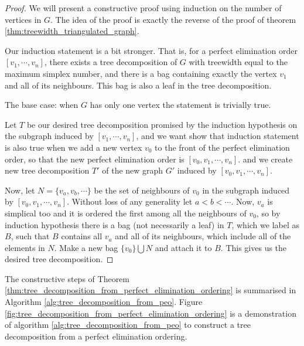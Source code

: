 \begin{proof}
	We will present a constructive proof using induction on the number of vertices in $G$.
	The idea of the proof is exactly the reverse of the proof of theorem \ref{thm:treewidth_triangulated_graph}.

	Our induction statement is a bit stronger. That is, for a perfect elimination order $[v_1, \cdots, v_n]$, there exists a tree decomposition of $G$ with treewidth equal to the maximum simplex number, and there is a bag containing exactly the vertex $v_1$ and all of its neighbours. This bag is also a leaf in the tree decomposition.

	The base case: when $G$ has only one vertex the statement is trivially true.

	Let $T$ be our desired tree decomposition promised by the induction hypothesis on the subgraph induced by $[v_1, \cdots, v_n]$, and we want show that induction statement is also true when we add a new vertex $v_0$ to the front of the perfect elimination order, so that the new perfect elimination order is $[v_0, v_1, \cdots, v_n]$. and we create new tree decomposition $T'$ of the new graph $G'$ induced by $[v_0, v_1, \cdots, v_n]$.

	Now, let $N = \{v_a, v_b, \cdots\}$ be the set of neighbours of $v_0$ in the subgraph induced by $[v_0, v_1, \cdots, v_n]$. 
	Without loss of any generality let $a < b < \cdots$. 
	Now, $v_a$ is simplical too and it is ordered the first among all the neighbours of $v_0$, so by induction hypothesis there is a bag (not necessarily a leaf) in $T$, which we label as $B$, such that $B$ contains all $v_a$ and all of its neighbours, which include all of the elements in $N$. 
	Make a new bag $\{v_0\} \bigcup N$ and attach it to $B$.
	This gives us the desired tree decomposition.
\end{proof}


The constructive steps of Theorem \ref{thm:tree_decomposition_from_perfect_elimination_ordering} is summarised in Algorithm \ref{alg:tree_decomposition_from_peo}.
Figure \ref{fig:tree_decomposition_from_perfect_elimination_ordering} is a demonstration of algorithm \ref{alg:tree_decomposition_from_peo} to construct a tree decomposition from a perfect elimination ordering.

